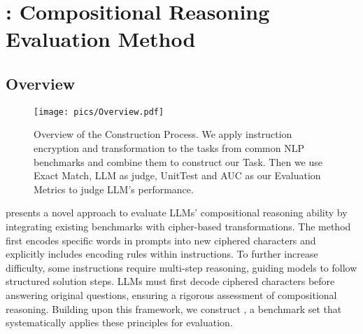 \section{\ourmethod{}: Compositional Reasoning Evaluation Method}
\label{sec:methods}

\subsection{Overview}
\begin{figure*}[ht]
\centering
\vskip 0.2in
\texttt{[image: pics/Overview.pdf]}
\caption{Overview of the \benchmark{} Construction Process. We apply instruction encryption and transformation to the tasks from common NLP benchmarks and combine them to construct our \benchmark{} Task. Then we use Exact Match, LLM as judge, UnitTest and AUC as our Evaluation Metrics to judge LLM's performance. }
\label{fig:overview}
\vskip -0.2in
\end{figure*}


\ourmethod{} presents a novel approach to evaluate LLMs’ compositional reasoning ability by integrating existing benchmarks with cipher-based transformations.
The method first encodes specific words in prompts into new ciphered characters and explicitly includes encoding rules within instructions.
To further increase difficulty, some instructions require multi-step reasoning, guiding models to follow structured solution steps.
LLMs must first decode ciphered characters before answering original questions, ensuring a rigorous assessment of compositional reasoning.
Building upon this framework, we construct \benchmark{}, a benchmark set that systematically applies these principles for evaluation.

